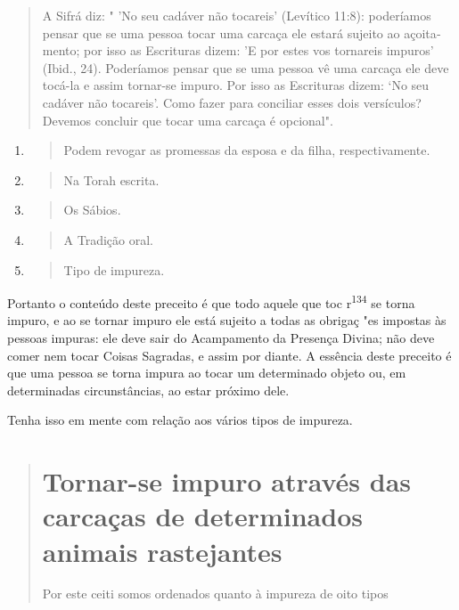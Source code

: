 \begin{quote}
A Sifrá diz: " 'No seu cadáver não tocareis' (Levítico 11:8):
podería­mos pensar que se uma pessoa tocar uma carcaça ele estará
sujeito ao açoita­mento; por isso as Escrituras dizem: 'E por estes vos
tornareis impuros' (Ibid., 24). Poderíamos pensar que se uma pessoa vê
uma carcaça ele deve tocá-la e assim tornar-se impuro. Por isso as
Escrituras dizem: `No seu cadáver não toca­reis'. Como fazer para
conciliar esses dois versículos? Devemos concluir que tocar uma carcaça
é opcional".
\end{quote}

\begin{enumerate}
\def\labelenumi{\arabic{enumi}.}
\setcounter{enumi}{128}
\item
 \begin{quote}
 Podem revogar as promessas da esposa e da filha, respectivamente.
 \end{quote}
\item
 \begin{quote}
 Na Torah escrita.
 \end{quote}
\item
 \begin{quote}
 Os Sábios.
 \end{quote}
\item
 \begin{quote}
 A Tradição oral.
 \end{quote}
\item
 \begin{quote}
 Tipo de impureza.
 \end{quote}
\end{enumerate}
Portanto o conteúdo deste preceito é que todo aquele que toc
r\textsuperscript{134} se torna impuro, e ao se tornar impuro ele está
sujeito a todas as obrigaç "es impostas às pessoas impuras: ele deve
sair do Acampamento da Presença Divi­na; não deve comer nem tocar Coisas
Sagradas, e assim por diante. A essência deste preceito é que uma pessoa
se torna impura ao tocar um determinado ob­jeto ou, em determinadas
circunstâncias, ao estar próximo dele.

Tenha isso em mente com relação aos vários tipos de impureza.

\begin{quote}
\section{Tornar-se impuro através das carcaças de determinados animais rastejantes}

Por este ceiti somos ordenados quanto à impureza de oito tipos
\end{quote}

